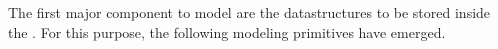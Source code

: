 %
%
%
The first major component to model are the datastructures to be stored inside the \db.
For this purpose, the following modeling primitives have emerged.%
%
%
%
%
\endhsection%
%
